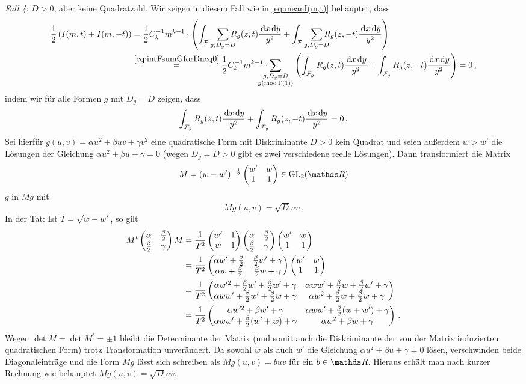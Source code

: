\begin{bewe}
\emph{Fall 4}: $D > 0$, aber keine Quadratzahl. Wir zeigen in diesem Fall wie in \eqref{eq:meanI(m,t)} behauptet, dass 
\begin{align*}
	\frac 12 \left( I(m,t) + I(m,-t) \right) 
	&= \frac 12 C_k^{-1} m^{k-1} \cdot \left( \int_\F \smashoperator[r]{\sum_{g, D_g = D}} R_g(z,t) \frac {\opd x \opd y}{y^2} + \int_\F \smashoperator[r]{\sum_{g, D_g = D}} R_g(z,-t) \frac {\opd x \opd y}{y^2} \right) \\
	& \overset{\eqref{eq:intFsumGforDneq0}}= \frac 12 C_k^{-1} m^{k-1} \cdot \smashoperator[l]{\sum_{\substack{g, D_g = D \\ g (\operatorname{mod} \Gamma(1))}}} \left( \int_{\F_g} R_g (z,t) \frac{\opd x \opd y}{y^2} + \int_{\F_g} R_g (z,-t) \frac{\opd x \opd y}{y^2} \right)
	= 0
	\,,
\end{align*}
indem wir für alle Formen $g$ mit $D_g = D$ zeigen, dass
\[
	\int_{\mathcal{F}_g} R_g (z, t) \frac {\,\mathrm{d} x \,\mathrm{d} y}{y^2} + \int_{\mathcal{F}_g} R_g (z, -t) \frac {\,\mathrm{d} x \,\mathrm{d} y}{y^2} = 0
	\,.
\]
Sei hierfür $g(u, v) = \alpha u^2 + \beta uv + \gamma v^2$ eine quadratische Form mit Diskriminante $D > 0$ kein Quadrat und seien außerdem $w > w'$ die Lösungen der Gleichung $\alpha u^2 + \beta u + \gamma = 0$ (wegen $D_g = D > 0$ gibt es zwei verschiedene reelle Lösungen). Dann transformiert die Matrix
\[
	M = (w - w')^{- \frac 12} \mymat*{w'}w11 \in \GL_2(\RR)
\]
$g$ in $Mg$ mit
\[
	M g(u, v) = \sqrt{D} uv
	\,.
\]
In der Tat: Ist $T = \sqrt{w-w'}$, so gilt
\begin{align*}
	M^t \mymat*{\alpha}{\frac \beta 2}{\frac \beta 2}{\gamma} M 
	&= \frac{1}{T^2} \mymat*{w'}1w1 \mymat*{\alpha}{\frac \beta 2}{\frac \beta 2}{\gamma} \mymat*{w'}w11 \\
	&= \frac{1}{T^2} \mymat*{\alpha w' + \frac \beta 2}{\frac \beta 2 w' + \gamma}{\alpha w + \frac \beta 2}{\frac \beta 2 w + \gamma} \mymat*{w'}w11 \\
	&= \frac{1}{T^2} \mymat*{\alpha w'^2 + \frac \beta 2 w' + \frac \beta 2 w' + \gamma}{\alpha ww' + \frac \beta 2 w + \frac \beta 2 w' + \gamma}{\alpha ww' + \frac \beta 2 w' + \frac \beta 2 w + \gamma}{\alpha w^2 + \frac \beta 2 w + \frac \beta 2 w + \gamma} \\
	&= \frac{1}{T^2} \mymat*{\alpha w'^2 + \beta w' + \gamma}{\alpha ww' + \frac \beta 2 (w + w') + \gamma}{\alpha ww' + \frac \beta 2 (w' + w) + \gamma}{\alpha w^2 + \beta w + \gamma}
	\,.
\end{align*}
Wegen $\det M = \det M^t = \pm 1$ bleibt die Determinante der Matrix (und somit auch die Diskriminante der von der Matrix induzierten quadratischen Form) trotz Transformation unverändert. Da sowohl $w$ als auch $w'$ die Gleichung $\alpha u^2 + \beta u + \gamma = 0$ lösen, verschwinden beide Diagonaleinträge und die Form $Mg$ lässt sich schreiben als $Mg(u, v) = b uv$ für ein $b \in \RR$. Hieraus erhält man nach kurzer Rechnung wie behauptet $Mg(u, v) = \sqrt D uv$.


\end{bewe}
